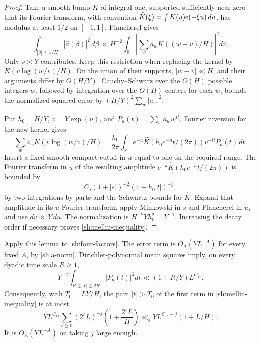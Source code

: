 \begin{proof}
Take a smooth bump $K$ of integral one, supported sufficiently near
zero that its Fourier transform, with convention
$\widehat K(\xi)=\int K(u)\mathrm{e}(-\xi u)\,du$, has modulus at least
$1/2$ on $[-1,1]$.  Plancherel gives
\[
 \int_{|\beta|\leq1/H}|\widehat a(\beta)|^2\,d\beta
 \ll H^{-2}\int_{\mathbb R}
          \left|\sum_w a_wK((w-v)/H)\right|^2dv.
\]
Only $v\asymp Y$ contributes.  Keep this restriction when replacing
the kernel by $K(v\log(w/v)/H)$.  On the union of their supports,
$|w-v|\ll H$, and their arguments differ by $O(H/Y)$.
Cauchy--Schwarz over the $O(H)$ possible integers $w$, followed
by integration over the $O(H)$ centers for each $w$, bounds the
normalized squared error by $(H/Y)^2\sum_w|a_w|^2$.

Put $h_0=H/Y$, $v=Y\exp(u)$, and $P_a(t)=\sum_w a_ww^{it}$.
Fourier inversion for the new kernel gives
\[
 \sum_w a_wK(v\log(w/v)/H)
 =\frac{h_0}{2\pi}\int_{\mathbb R}
   e^{-u}\widehat K(h_0e^{-u}t/(2\pi))v^{-it}P_a(t)\,dt.
\]
Insert a fixed smooth compact cutoff in $u$ equal to one on the
required range.  The Fourier transform in $u$ of the resulting
amplitude $e^{-u}\widehat K(h_0e^{-u}t/(2\pi))$ is bounded by
\[
 C_j(1+|s|)^{-2}(1+h_0|t|)^{-j},
\]
by two integrations by parts and the Schwartz bounds for
$\widehat K$.  Expand that amplitude in its $u$-Fourier transform,
apply Minkowski in $s$ and Plancherel in $u$, and use $dv\ll Y\,du$.
The normalization is $H^{-2}Yh_0^2=Y^{-1}$.  Increasing the decay
order if necessary proves \eqref{sh:mellin-inequality}.
\end{proof}

Apply this lemma to \eqref{sh:four-factors}.  The error term is
$O_A(YL^{-A})$ for every fixed $A$, by \eqref{sh:a-norm}.
Dirichlet-polynomial mean squares imply, on every dyadic time scale
$R\geq1$,
\begin{equation}\label{sh:mellin-tail-ms}
 Y^{-2}\int_{R\leq|t|\leq2R}|P_a(t)|^2dt
 \ll(1+R/Y)L^{C_{11}}.
\end{equation}
Consequently, with $T_0=LY/H$, the part $|t|>T_0$ of the first
term in \eqref{sh:mellin-inequality} is at most
\[
 YL^{C_{11}}\sum_{r\geq0}
       (2^rL)^{-j}\left(1+\frac{2^rL}{H}\right)
 \ll_j YL^{C_{11}-j}(1+L/H).
\]
It is $O_A(YL^{-A})$ on taking $j$ large enough.

